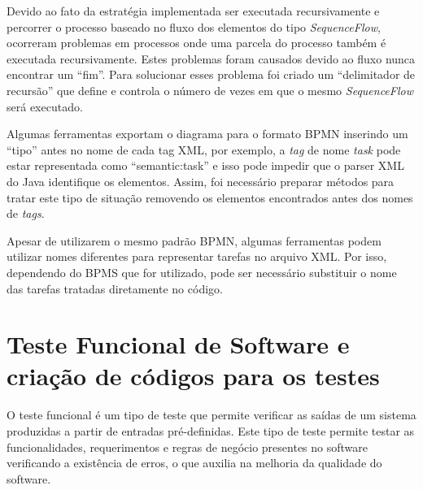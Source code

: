 \documentclass[12pt]{article}
\begin{document}

Devido ao fato da estratégia implementada ser executada recursivamente e percorrer o processo baseado no fluxo dos elementos do tipo \emph{SequenceFlow}, ocorreram problemas em processos onde uma parcela do processo também é executada recursivamente. Estes problemas foram causados devido ao fluxo nunca encontrar um ``fim''. Para solucionar esses problema foi criado um ``delimitador de recursão'' que define e controla o número de vezes em que o mesmo \emph{SequenceFlow} será executado.

Algumas ferramentas exportam o diagrama para o formato BPMN inserindo um ``tipo'' antes no nome de cada tag XML, por exemplo, a \emph{tag} de nome \emph{task} pode estar representada como ``semantic:task'' e isso pode impedir que o parser XML do Java identifique os elementos. Assim, foi necessário preparar métodos para tratar este tipo de situação removendo os elementos encontrados antes dos nomes de \emph{tags}.

Apesar de utilizarem o mesmo padrão BPMN, algumas ferramentas podem utilizar nomes diferentes para representar tarefas no arquivo XML. Por isso, dependendo do BPMS que for utilizado, pode ser necessário substituir o nome das tarefas tratadas diretamente no código.




\section{Teste Funcional de Software e criação de códigos para os testes}
O teste funcional é um tipo de teste que permite verificar as saídas de um sistema produzidas a partir de entradas pré-definidas. Este tipo de teste permite testar as funcionalidades, requerimentos e regras de negócio presentes no software~\cite{molinari2003testes} verificando a existência de erros, o que auxilia na melhoria da qualidade do software.
\end{document}
